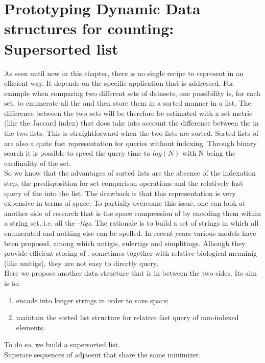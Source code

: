 \section{Prototyping Dynamic Data structures for \kmer counting: Super\kmer sorted list}
\label{sec:skmers}
As seen until now in this chapter, there is no single recipe to represent \kmers in an efficient way. It depends on the specific application that is addressed. For example when comparing two different sets of datasets, one possibility is, for each set, to enumerate all the \kmers and then store them in a sorted manner in a list. The difference between the two sets will be therefore be estimated with a set metric (like the Jaccard index) that does take into account the difference between the \kmers in the two lists. This is straightforward when the two lists are sorted. Sorted lists of \kmers are also a quite fast representation for \kmer queries without indexing. Through binary search it is possible to speed the query time to $log(N)$ with N being the cardinality of the set.\\
So we know that the advantages of sorted \kmer lists are the absence of the indexation step, the predisposition for set comparison operations and the relatively fast query of the \kmer into the list. The drawback is that this representation is very expensive in terms of space. To partially overcome this issue, one can look at another side of \kmer research that is the space compression of \kmer by encoding them within a string set, i.e. all the \emph{-tigs}. The rationale is to build a set of strings in which all enumerated \kmers and nothing else can be spelled. In recent years various models have been proposed, among which untigis, eulertigs and simplitings. Alhough they provide efficient storing of \kmers, sometimes together with relative biological meaninig (like unitigs), they are not easy to directly query.\\
Here we propose another data structure that is in between the two sides. Its aim is to:
\begin{enumerate}
	\item encode \kmers into longer strings in order to save space;
	\item maintain the sorted list structure for relative fast query of non-indexed elements.
\end{enumerate}
To do so, we build a super\kmer sorted list.\\
Super\kmers are sequences of adjacent \kmers that share the same minimizer. \\
